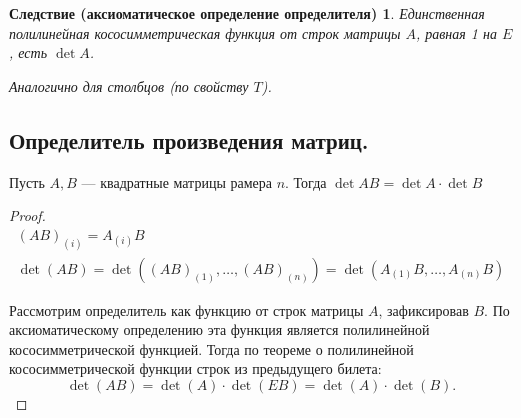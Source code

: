 \documentclass[a4paper, 12pt]{article}
\newtheorem*{que24cons}{Следствие (аксиоматическое определение определителя)}
\begin{document}
\begin{que24cons}
Единственная полилинейная кососимметрическая функция от строк матрицы $A$, равная 1 на $E$, есть $\det A$.

Аналогично для столбцов (по свойству $T$).
\end{que24cons}

\subsection{Определитель произведения матриц.}
Пусть $A, B$ — квадратные матрицы рамера $n$. Тогда $\det{AB} = \det{A}\cdot\det{B}$

\begin{proof}
\begin{gather*}
(AB)_{(i)}=A_{(i)}B \\
\det(AB)=\det( (AB)_{(1)}, \ldots, (AB)_{(n)} ) = \det (A_{(1)}B, \ldots, A_{(n)}B )
\end{gather*}

Рассмотрим определитель как функцию от строк матрицы $A$, зафиксировав $B$. По аксиоматическому определению эта функция является полилинейной кососимметрической функцией. Тогда по теореме о полилинейной кососимметрической функции строк из предыдущего билета: 
$$\det(AB) = \det(A) \cdot \det (EB) = \det(A) \cdot \det(B).$$
\end{proof}

\end{document}
